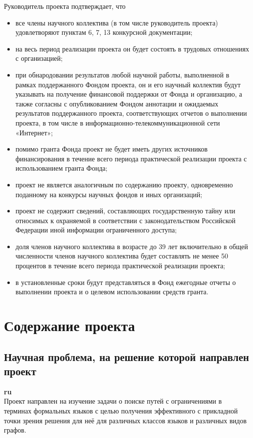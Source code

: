 \documentclass[12pt]{article}  %
\theoremstyle{remark}
\begin{document}
\vline
Руководитель проекта подтверждает, что
\begin{itemize}
\item все члены научного коллектива (в том числе руководитель проекта) удовлетворяют пунктам 6, 7, 13 конкурсной документации;
\item на весь период реализации проекта он будет состоять в трудовых отношениях с организацией;
\item при обнародовании результатов любой научной работы, выполненной в рамках поддержанного Фондом проекта, он и его научный коллектив будут указывать на получение финансовой поддержки от Фонда и организацию, а также согласны с опубликованием Фондом аннотации и ожидаемых результатов поддержанного проекта, соответствующих отчетов о выполнении проекта, в том числе в информационно-телекоммуникационной сети «Интернет»;
\item помимо гранта Фонда проект не будет иметь других источников финансирования в течение всего периода практической реализации проекта с использованием гранта Фонда;
\item проект не является аналогичным по содержанию проекту, одновременно поданному на конкурсы научных фондов и иных организаций;
\item проект не содержит сведений, составляющих государственную тайну или относимых к охраняемой в соответствии с законодательством Российской Федерации иной информации ограниченного доступа;
\item доля членов научного коллектива в возрасте до 39 лет включительно в общей численности членов научного коллектива будет составлять не менее 50 процентов в течение всего периода практической реализации проекта;
\item в установленные сроки будут представляться в Фонд ежегодные отчеты о выполнении проекта и о целевом использовании средств гранта.
\end{itemize}

\section{Содержание проекта}

\subsection{Научная проблема, на решение которой направлен проект}

\textbf{ru}\\
%
Проект направлен на изучение задачи о поиске путей с ограничениями в терминах формальных языков с целью получения эффективного с прикладной точки зрения решения для неё для различных классов языков и различных видов графов.
\end{document}
